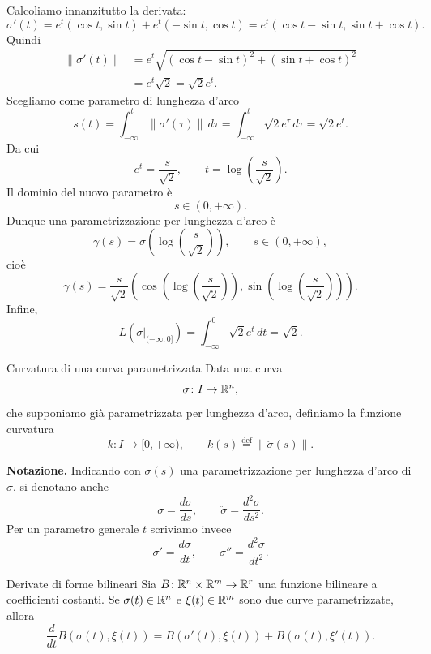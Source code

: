 \documentclass[a4paper]{article}
\begin{document}
\begin{snippetsolution}{}
    Calcoliamo innanzitutto la derivata:
    \[
        \sigma'(t)=e^t(\cos t,\sin t)+e^t(-\sin t,\cos t)
        =
        e^t(\cos t-\sin t,\sin t+\cos t).
    \]
    Quindi
    \begin{align*}
        \left\|\sigma'(t)\right\|
        &=
        e^t\sqrt{(\cos t-\sin t)^2+(\sin t+\cos t)^2}\\
        &=
        e^t\sqrt{2}
        =
        \sqrt{2}e^t.
    \end{align*}
    Scegliamo come parametro di lunghezza d'arco
    \[
        s(t)=\int_{-\infty}^t \left\|\sigma'(\tau)\right\|\,d\tau
        =
        \int_{-\infty}^t \sqrt{2}e^\tau\,d\tau
        =
        \sqrt{2}e^t.
    \]
    Da cui
    \[
        e^t=\frac{s}{\sqrt{2}},
        \qquad
        t=\log\left(\frac{s}{\sqrt{2}}\right).
    \]
    Il dominio del nuovo parametro è
    \[
        s\in(0,+\infty).
    \]
    Dunque una parametrizzazione per lunghezza d'arco è
    \[
        \gamma(s)
        =
        \sigma\left(\log\left(\frac{s}{\sqrt{2}}\right)\right),
        \qquad s\in(0,+\infty),
    \]
    cioè
    \[
        \gamma(s)
        =
        \frac{s}{\sqrt{2}}
        \left(
            \cos\left(\log\left(\frac{s}{\sqrt{2}}\right)\right),
            \sin\left(\log\left(\frac{s}{\sqrt{2}}\right)\right)
        \right).
    \]
    Infine,
    \[
        L\left(\sigma\big|_{(-\infty,0]}\right)
        =
        \int_{-\infty}^{0}\sqrt{2}e^t\,dt
        =
        \sqrt{2}.
    \]
\end{snippetsolution}

\begin{snippetdefinition}{Curvatura di una curva parametrizzata}
Data una curva
\[
     \sigma \colon I \to \mathbb{R}^n,
\]
che supponiamo già parametrizzata per lunghezza d'arco, definiamo la funzione curvatura
\[
     k\colon I\to [0,+\infty),
     \qquad
     k(s)\overset{\mathrm{def}}{=} \|\ddot\sigma(s)\|.
\]
\end{snippetdefinition}

\textbf{Notazione.} Indicando con \(\sigma(s)\) una parametrizzazione per lunghezza d'arco di \(\sigma\), si denotano anche
\[
     \dot\sigma=\frac{d\sigma}{ds},
     \qquad
     \ddot\sigma=\frac{d^2\sigma}{ds^2}.
\]
Per un parametro generale \(t\) scriviamo invece
\[
     \sigma'=\frac{d\sigma}{dt},
     \qquad
     \sigma''=\frac{d^2\sigma}{dt^2}.
\]

\begin{snippetproposition}{Derivate di forme bilineari}
Sia \(B\colon \mathbb{R}^n\times \mathbb{R}^m\to \mathbb{R}^r\) una funzione bilineare a coefficienti costanti. Se \(\sigma(t)\in \mathbb{R}^n\) e \(\xi(t)\in \mathbb{R}^m\) sono due curve parametrizzate, allora
\[
     \frac{d}{dt}B(\sigma(t),\xi(t)) = B(\sigma'(t),\xi(t))+B(\sigma(t),\xi'(t)).
\]
\end{snippetproposition}
\end{document}

